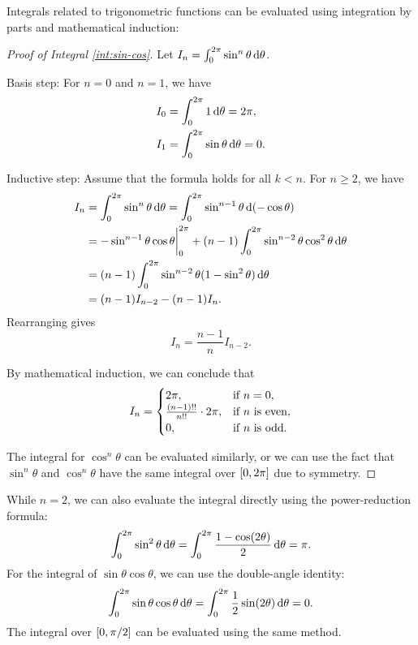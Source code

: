 Integrals related to trigonometric functions can be evaluated using integration by parts and mathematical induction:

\begin{proof}[Proof of Integral \ref{int:sin-cos}]
  Let $I_n = \int_0^{2\mathrm{\pi}} \sin^n \theta\,\mathrm{d}\theta$.

  Basis step: For $n = 0$ and $n = 1$, we have
  \begin{align*}
    I_0 &= \int_0^{2\mathrm{\pi}} 1\,\mathrm{d}\theta = 2\mathrm{\pi}, \\
    I_1 &= \int_0^{2\mathrm{\pi}} \sin \theta\,\mathrm{d}\theta = 0.
  \end{align*}

  Inductive step: Assume that the formula holds for all $k < n$. For $n \geq 2$, we have
  \begin{align*}
    I_n &= \int_0^{2\mathrm{\pi}} \sin^n \theta\,\mathrm{d}\theta = \int_0^{2\mathrm{\pi}} \sin^{n-1} \theta\, \mathrm{d}(-\cos \theta) \\
    &= -\sin^{n-1} \theta \cos \theta \bigg|_0^{2\mathrm{\pi}} + (n-1) \int_0^{2\mathrm{\pi}} \sin^{n-2} \theta \cos^2 \theta\,\mathrm{d}\theta \\
    &= (n-1) \int_0^{2\mathrm{\pi}} \sin^{n-2} \theta (1 - \sin^2 \theta)\,\mathrm{d}\theta \\
    &= (n-1) I_{n-2} - (n-1) I_n.
  \end{align*}
  Rearranging gives
  \[
    I_n = \frac{n-1}{n} I_{n-2}.
  \]

  By mathematical induction, we can conclude that
  \[
    I_n = \begin{cases}
      2\mathrm{\pi}, & \text{if $n = 0$}, \\
      \frac{(n-1)!!}{n!!} \cdot 2\mathrm{\pi}, & \text{if $n$ is even}, \\
      0, & \text{if $n$ is odd}.
    \end{cases}
  \]

  The integral for $\cos^n \theta$ can be evaluated similarly, or we can use the fact that $\sin^n \theta$ and $\cos^n \theta$ have the same integral over $[0, 2\mathrm{\pi}]$ due to symmetry.
\end{proof}

While $n = 2$, we can also evaluate the integral directly using the power-reduction formula:
\[
  \int_0^{2\mathrm{\pi}} \sin^2 \theta\,\mathrm{d}\theta = \int_0^{2\mathrm{\pi}} \frac{1 - \cos(2\theta)}{2}\,\mathrm{d}\theta = \mathrm{\pi}.
\]
For the integral of $\sin \theta \cos \theta$, we can use the double-angle identity:
\[
  \int_0^{2\mathrm{\pi}} \sin \theta \cos \theta\,\mathrm{d}\theta = \int_0^{2\mathrm{\pi}} \frac{1}{2} \sin(2\theta)\,\mathrm{d}\theta = 0.
\]
The integral over $[0, \mathrm{\pi}/2]$ can be evaluated using the same method.

